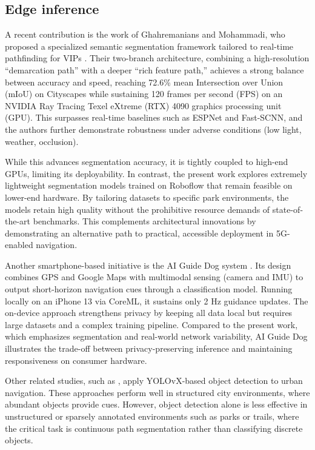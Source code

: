\documentclass{ieeeaccess}
\begin{document}
\subsection{Edge inference}

A recent contribution is the work of Ghahremanians and Mohammadi, who proposed a specialized semantic segmentation framework tailored to real-time pathfinding for VIPs \cite{pathfinding2025}. Their two-branch architecture, combining a high-resolution “demarcation path” with a deeper “rich feature path,” achieves a strong balance between accuracy and speed, reaching 72.6\% mean Intersection over Union (mIoU) on Cityscapes while sustaining 120 frames per second (FPS) on an NVIDIA Ray Tracing Texel eXtreme (RTX) 4090 graphics processing unit (GPU). This surpasses real-time baselines such as ESPNet and Fast-SCNN, and the authors further demonstrate robustness under adverse conditions (low light, weather, occlusion).

While this advances segmentation accuracy, it is tightly coupled to high-end GPUs, limiting its deployability. In contrast, the present work explores extremely lightweight segmentation models trained on Roboflow that remain feasible on lower-end hardware. By tailoring datasets to specific park environments, the models retain high quality without the prohibitive resource demands of state-of-the-art benchmarks. This complements architectural innovations by demonstrating an alternative path to practical, accessible deployment in 5G-enabled navigation.

Another smartphone-based initiative is the AI Guide Dog system \cite{chen2025aigd}. Its design combines GPS and Google Maps with multimodal sensing (camera and IMU) to output short-horizon navigation cues through a classification model. Running locally on an iPhone 13 via CoreML, it sustains only 2 Hz guidance updates. The on-device approach strengthens privacy by keeping all data local but requires large datasets and a complex training pipeline. Compared to the present work, which emphasizes segmentation and real-world network variability, AI Guide Dog illustrates the trade-off between privacy-preserving inference and maintaining responsiveness on consumer hardware.

Other related studies, such as \cite{khan2025enhancing,11156811}, apply YOLOvX-based object detection to urban navigation. These approaches perform well in structured city environments, where abundant objects provide cues. However, object detection alone is less effective in unstructured or sparsely annotated environments such as parks or trails, where the critical task is continuous path segmentation rather than classifying discrete objects.
\end{document}
